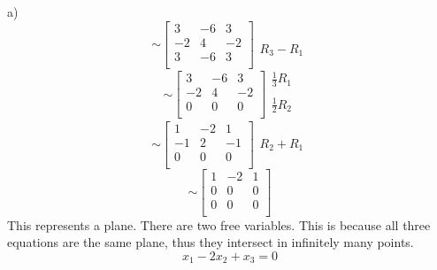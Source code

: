 \documentclass[12pt]{article}
\newcommand{\sqbrl}{\left[}
\newcommand{\sqbrr}{\right]}
\begin{document}
a)\\
	\[\sim
		\sqbrl\begin{matrix}
		3 & -6 & 3\\
		-2 & 4 & -2\\
		3 & -6 & 3\\
		\end{matrix}\sqbrr\begin{matrix}\\\\R_3-R_1\end{matrix}\]
	\[\sim
		\sqbrl\begin{matrix}
		3 & -6 & 3\\
		-2 & 4 & -2\\
		0 & 0 & 0\\
		\end{matrix}\sqbrr\begin{matrix}\frac{1}{3}R_1\\\\\frac{1}{2}R_2\\\end{matrix}\]
	\[\sim
		\sqbrl\begin{matrix}
		1 & -2 & 1\\
		-1 & 2 & -1\\
		0 & 0 & 0\\
		\end{matrix}\sqbrr\begin{matrix}\\R_2+R_1\\\end{matrix}\]
	\[\sim
		\sqbrl\begin{matrix}
		1 & -2 & 1\\
		0 & 0 & 0\\
		0 & 0 & 0\\
		\end{matrix}\sqbrr\]
This represents a plane. There are two free variables. This is because all three equations are the same plane, thus they intersect in infinitely many points.
\[x_1 -2x_2 +x_3 = 0\]
\end{document}
